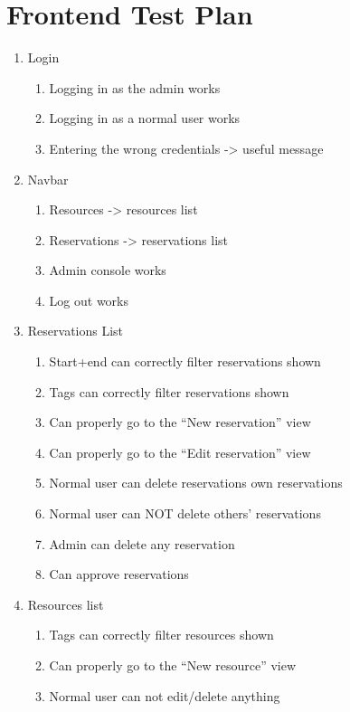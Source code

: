 \documentclass[12pt]{article}
\begin{document}
\section{Frontend Test Plan}
\label{appendix:frontendtest}
\begin{enumerate}
    \item Login
    \begin{enumerate}
        \item Logging in as the admin works
        \item Logging in as a normal user works
        \item Entering the wrong credentials -> useful message
    \end{enumerate}
    \item Navbar
    \begin{enumerate}
        \item Resources -> resources list
        \item Reservations -> reservations list
        \item Admin console works
        \item Log out works
    \end{enumerate}
    \item Reservations List
    \begin{enumerate}
        \item Start+end can correctly filter reservations shown
        \item Tags can correctly filter reservations shown
        \item Can properly go to the ``New reservation'' view
        \item Can properly go to the ``Edit reservation'' view
        \item Normal user can delete reservations own reservations
        \item Normal user can NOT delete others' reservations
        \item Admin can delete any reservation
        \item Can approve reservations
    \end{enumerate}
    \item Resources list
    \begin{enumerate}
        \item Tags can correctly filter resources shown
        \item Can properly go to the ``New resource'' view
        \item Normal user can not edit/delete anything

\end{enumerate}
\end{enumerate}
\end{document}
